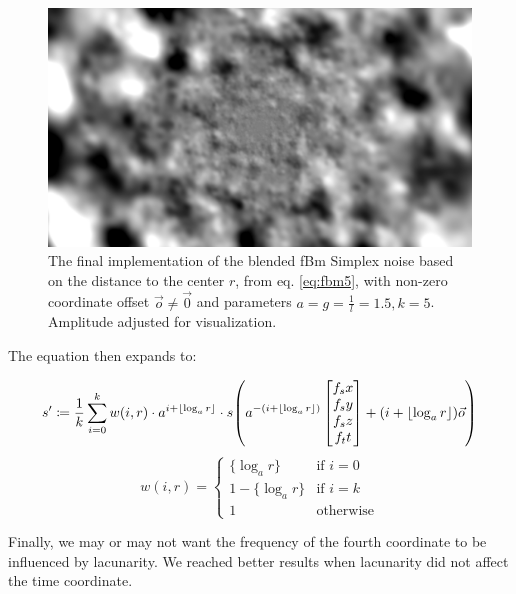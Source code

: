 \begin{figure}[ht]
    \centering
    \ifgraphics
        \includegraphics[width=\linewidth]{img/noise-final.png}%
    \fi
    \caption{The final implementation of the blended \ac{fBm} Simplex noise based on the distance to the center $r$, from eq. \ref{eq:fbm5}, with non-zero coordinate offset $\vec{o} \ne \vec{0}$ and parameters $a = g = \frac{1}{l} = 1.5, k = 5$. Amplitude adjusted for visualization.}
    \label{fig:noise-demo-final}
\end{figure}

The equation then expands to:

\begin{equation}\label{eq:fbm4}
    s' \coloneqq \frac{1}{k} \sum_{i=0}^{k} w(i, r) \cdot a^{i + \lfloor \log_a r \rfloor} \cdot s\mleft(a^{-(i + \lfloor \log_a r \rfloor)} \begin{bmatrix}f_sx\\f_sy\\f_sz\\f_tt\end{bmatrix} + (i + \lfloor \log_a r \rfloor) \vec{o}\mright)
\end{equation}
\begin{equation}
    w(i, r) =
    \begin{cases}
        \{\log_a r\} & \text{if } i = 0 \\
        1 - \{\log_a r\} & \text{if } i = k \\
        1 & \text{otherwise}
    \end{cases}
\end{equation}

Finally, we may or may not want the frequency of the fourth coordinate to be influenced by lacunarity. We reached better results when lacunarity did not affect the time coordinate.

